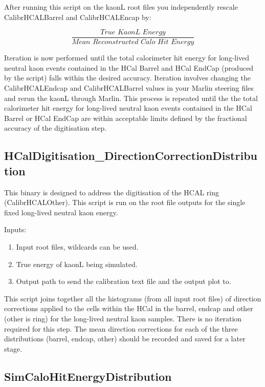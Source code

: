 \documentclass[11pt, oneside]{article}   	%
\begin{document}
After running this script on the kaonL root files you independently rescale CalibrHCALBarrel and CalibrHCALEncap by:

\begin{equation}
\frac{\textit{True KaonL Energy}}{\textit{Mean Reconstructed Calo Hit Energy}}
\end{equation}

Iteration is now performed until the total calorimeter hit energy for long-lived neutral kaon events contained in the HCal Barrel and HCal EndCap (produced by the script) falls within the desired accuracy.  Iteration involves changing the CalibrHCALEndcap and CalibrHCALBarrel values in your Marlin steering files and rerun the kaonL through Marlin.  This process is repeated until the the total calorimeter hit energy for long-lived neutral kaon events contained in the HCal Barrel or HCal EndCap are within acceptable limits defined by the fractional accuracy of the digitisation step.

\subsection{HCalDigitisation\_DirectionCorrectionDistribution}

This binary is designed to address the digitisation of the HCAL ring (CalibrHCALOther).  This script is run on the root file outputs for the single fixed long-lived neutral kaon energy.

Inputs:
\begin{enumerate}
\item Input root files, wildcards can be used.
\item True energy of kaonL being simulated.
\item Output path to send the calibration text file and the output plot to.
\end{enumerate}

This script joins together all the histograms (from all input root files) of direction corrections applied to the cells within the HCal in the barrel, endcap and other (other is ring) for the long-lived neutral kaon samples.  There is no iteration required for this step.  The mean direction corrections for each of the three distributions (barrel, endcap, other) should be recorded and saved for a later stage.

\subsection{SimCaloHitEnergyDistribution}
\end{document}
